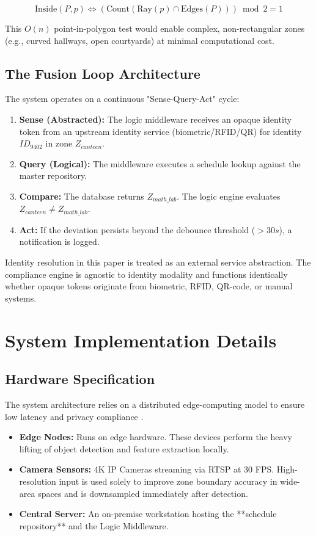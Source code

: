 \documentclass[conference]{IEEEtran}
\begin{document}
\begin{equation}
\text{Inside}(P, p) \iff (\text{Count}(\text{Ray}(p) \cap \text{Edges}(P))) \bmod 2 = 1
\end{equation}

This $O(n)$ point-in-polygon test would enable complex, non-rectangular zones (e.g., curved hallways, open courtyards) at minimal computational cost.

\subsection{The Fusion Loop Architecture}
The system operates on a continuous "Sense-Query-Act" cycle:
\begin{enumerate}
    \item \textbf{Sense (Abstracted):} The logic middleware receives an opaque identity token from an upstream identity service (biometric/RFID/QR) for identity $ID_{9402}$ in zone $Z_{canteen}$.
    \item \textbf{Query (Logical):} The middleware executes a schedule lookup against the master repository.
    \item \textbf{Compare:} The database returns $Z_{math\_lab}$. The logic engine evaluates $Z_{canteen} \neq Z_{math\_lab}$.
    \item \textbf{Act:} If the deviation persists beyond the debounce threshold ($>30s$), a notification is logged.
\end{enumerate}

Identity resolution in this paper is treated as an external service abstraction. The compliance engine is agnostic to identity modality and functions identically whether opaque tokens originate from biometric, RFID, QR-code, or manual systems.

\section{System Implementation Details}

\subsection{Hardware Specification}
The system architecture relies on a distributed edge-computing model to ensure low latency and privacy compliance \cite{b15}.
\begin{itemize}
    \item \textbf{Edge Nodes:} Runs on edge hardware. These devices perform the heavy lifting of object detection and feature extraction locally.
    \item \textbf{Camera Sensors:} 4K IP Cameras streaming via RTSP at 30 FPS. High-resolution input is used solely to improve zone boundary accuracy in wide-area spaces and is downsampled immediately after detection.
    \item \textbf{Central Server:} An on-premise workstation hosting the **schedule repository** and the Logic Middleware.
\end{itemize}
\end{document}
